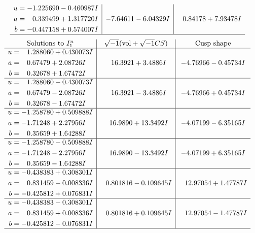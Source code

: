 \documentclass[1p]{elsarticle_modified}
\theoremstyle{definition}
\newcommand{\I}{\sqrt{-1}}
\begin{document}
$$\begin{array}{c|c|c}
\begin{aligned}
u &= -1.225690 - 0.460987 I \\
a &= \phantom{-}0.339499 + 1.317720 I \\
b &= -0.447158 + 0.574007 I\end{aligned}
 & -7.64611 - 6.04329 I & \phantom{-}0.84178 + 7.93478 I\\
 \hline 
 \end{array}$$\newpage$$\begin{array}{c|c|c}  
\text{Solutions to }I^u_{1}& \I (\text{vol} + \sqrt{-1}CS) & \text{Cusp shape}\\
 \hline 
\begin{aligned}
u &= \phantom{-}1.288060 + 0.430073 I \\
a &= \phantom{-}0.67479 + 2.08726 I \\
b &= \phantom{-}0.32678 + 1.67472 I\end{aligned}
 & \phantom{-}16.3921 + 3.4886 I & -4.76966 - 0.45734 I \\ \hline\begin{aligned}
u &= \phantom{-}1.288060 - 0.430073 I \\
a &= \phantom{-}0.67479 - 2.08726 I \\
b &= \phantom{-}0.32678 - 1.67472 I\end{aligned}
 & \phantom{-}16.3921 - 3.4886 I & -4.76966 + 0.45734 I \\ \hline\begin{aligned}
u &= -1.258780 + 0.509888 I \\
a &= -1.71248 + 2.27956 I \\
b &= \phantom{-}0.35659 + 1.64288 I\end{aligned}
 & \phantom{-}16.9890 + 13.3492 I & -4.07199 - 6.35165 I \\ \hline\begin{aligned}
u &= -1.258780 - 0.509888 I \\
a &= -1.71248 - 2.27956 I \\
b &= \phantom{-}0.35659 - 1.64288 I\end{aligned}
 & \phantom{-}16.9890 - 13.3492 I & -4.07199 + 6.35165 I \\ \hline\begin{aligned}
u &= -0.438383 + 0.308301 I \\
a &= \phantom{-}0.831459 - 0.008336 I \\
b &= -0.425812 + 0.076831 I\end{aligned}
 & \phantom{-}0.801816 - 0.109645 I & \phantom{-}12.97054 + 1.47787 I \\ \hline\begin{aligned}
u &= -0.438383 - 0.308301 I \\
a &= \phantom{-}0.831459 + 0.008336 I \\
b &= -0.425812 - 0.076831 I\end{aligned}
 & \phantom{-}0.801816 + 0.109645 I & \phantom{-}12.97054 - 1.47787 I\\
 \hline 
 \end{array}$$\newpage\newpage\renewcommand{\arraystretch}{1}
\end{document}
